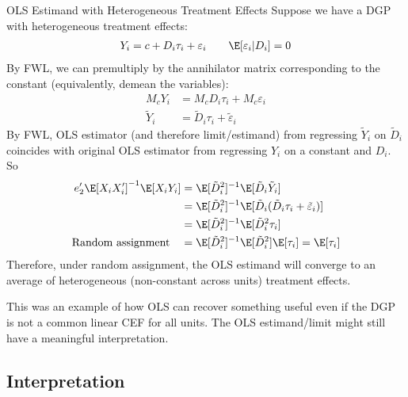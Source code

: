 \documentclass[aspectratio=169, handout]{beamer}
\begin{document}
{\footnotesize
\begin{frame}{OLS Estimand with Heterogeneous Treatment Effects}
Suppose we have a DGP with \alert{heterogeneous treatment effects}:
\begin{align*}
  Y_i = c + D_i\tau_i + \varepsilon_i
  \qquad
  \E[\varepsilon_i|D_i]=0
\end{align*}
By FWL, we can premultiply by the annihilator matrix corresponding to
the constant (equivalently, demean the variables):
\begin{align*}
  M_c Y_i
  &= M_cD_i\tau_i + M_c\varepsilon_i
  \\
  \tilde{Y}_i
  &= \tilde{D}_i\tau_i + \tilde{\varepsilon}_i
\end{align*}
By FWL, OLS estimator (and therefore limit/estimand) from regressing
$\tilde{Y}_i$ on $\tilde{D}_i$ coincides with original OLS estimator
from regressing $Y_i$ on a constant and $D_i$.
So
\begin{align*}
  e_2'
  \E[X_iX_i']^{-1}
  \E[X_iY_i]
  &=
  \E[\tilde{D}_i^2]^{-1}
  \E[\tilde{D}_i\tilde{Y}_i]
  \\
  &=
  \E[\tilde{D}_i^2]^{-1}
  \E[\tilde{D}_i(\tilde{D}_i\tau_i + \tilde{\varepsilon}_i)]
  \\
  &=
  \E[\tilde{D}_i^2]^{-1}
  \E[\tilde{D}_i^2\tau_i]
  \\
  \text{Random assignment}
  \quad
  &=
  \E[\tilde{D}_i^2]^{-1}
  \E[\tilde{D}_i^2]\E[\tau_i]
  =
  \E[\tau_i]
\end{align*}
Therefore, under random assignment, the OLS estimand will converge to an
average of \alert{heterogeneous} (non-constant across units) treatment
effects.

This was an example of how OLS can recover something useful even if
the DGP is not a common linear CEF for all units.
The OLS estimand/limit might still have a meaningful interpretation.
\end{frame}
}


\subsection{Interpretation}
\end{document}
